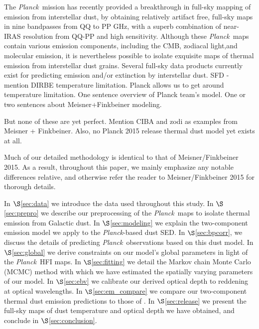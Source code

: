 \documentclass{emulateapj}
\newcommand{\PLANCK}{{\it Planck}}
\begin{document}
The \PLANCK~mission \citep{planck2013,planck2015} has recently provided a 
breakthrough in full-sky mapping of emission from interstellar dust, by 
obtaining relatively artifact free, full-sky maps in nine bandpasses from QQ to
PP GHz, with a superb combination of near-IRAS resolution from QQ-PP and high 
sensitivity. Although these \PLANCK~maps contain various emission components, 
including the CMB, zodiacal light,and molecular emission, it is nevertheless 
possible to isolate exquisite maps of thermal emission from interstellar dust 
grains.
Several full-sky data products currently exist for predicting emission and/or
extinction by interstellar dust. SFD - mention DIRBE temperature limitation.
Planck allows us to get around temperature limitation. One sentence overview of
Planck team's model. One or two sentences about Meisner+Finkbeiner modeling.

But none of these are yet perfect. Mention CIBA and zodi as examples from
Meisner + Finkbeiner. Also, no Planck 2015 release thermal dust model yet
exists at all.

Much of our detailed methodology is identical to that of Meisner/Finkbeiner 
2015. As a result, throughout this paper, we mainly emphasize any notable 
differences relative, and otherwise refer the reader to Meisner/Finkbeiner 
2015 for thorough details.

In $\S$\ref{sec:data} we introduce the data used throughout this study. In
$\S$\ref{sec:prepro} we describe our preprocessing of the \PLANCK~maps to
isolate thermal emission from Galactic dust. In $\S$\ref{sec:modeling} we
explain the two-component emission model we apply to the \PLANCK-based dust
SED. In $\S$\ref{sec:bpcorr}, we discuss the details of predicting
\PLANCK~observations based on this dust model. In $\S$\ref{sec:global} we
derive constraints on our model's global parameters in light of the \PLANCK~HFI
maps. In $\S$\ref{sec:fitting} we detail the Markov chain Monte Carlo (MCMC)
method with which we have estimated the spatially varying parameters of our
model. In $\S$\ref{sec:ebv} we calibrate our derived optical depth to reddening
at optical wavelengths. In $\S$\ref{sec:em_compare} we compare our
two-component thermal dust emission predictions to those of \cite{planckdust}.
In $\S$\ref{sec:release} we present the full-sky maps of dust temperature and
optical depth we have obtained, and conclude in $\S$\ref{sec:conclusion}.
\end{document}
